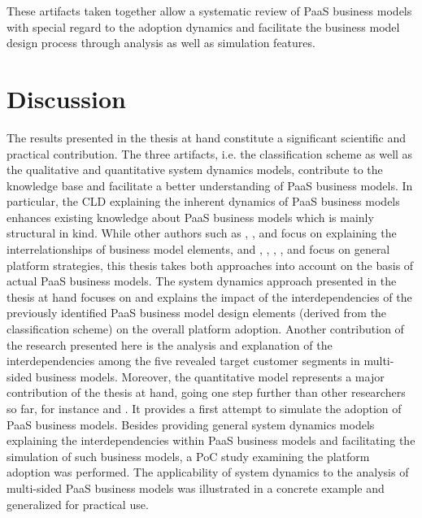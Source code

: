 	These artifacts taken together allow a systematic review of \ac{PaaS} business models with special regard to the adoption dynamics and facilitate the business model design process through analysis as well as simulation features. 

	

	\section{Discussion}\label{ch:dc:d}
		
	The results presented in the thesis at hand constitute a significant scientific and practical contribution. The three artifacts, i.e. the classification scheme as well as the qualitative and quantitative system dynamics models, contribute to the knowledge base and facilitate a better understanding of \ac{PaaS} business models. In particular, the \ac{CLD} explaining the inherent dynamics of \ac{PaaS} business models enhances existing knowledge about \ac{PaaS} business models which is mainly structural in kind. While other authors such as \citet{BenLagha2001}, \citet{Klueber2000}, and \citet{Kiani2009} focus on explaining the interrelationships of business model elements, and \citet{Cusumano2010}, \citet{Gawer2008}, \citet{Cusumano2002}, \citet{Eisenmann2006}, and \citet{Beimborn2011} focus on general platform strategies, this thesis takes both approaches into account on the basis of actual \ac{PaaS} business models. The system dynamics approach presented in the thesis at hand focuses on and explains the impact of the interdependencies of the previously identified \ac{PaaS} business model design elements (derived from the classification scheme) on the overall platform adoption. Another contribution of the research presented here is the analysis and explanation of the interdependencies among the five revealed target customer segments in multi-sided business models. Moreover, the quantitative model represents a major contribution of the thesis at hand, going one step further than other researchers so far, for instance \citet{Klueber2000} and \citet{Kiani2009}. It provides a first attempt to simulate the adoption of \ac{PaaS} business models. Besides providing general system dynamics models explaining the interdependencies within \ac{PaaS} business models and facilitating the simulation of such business models, a \acf{PoC} study examining the platform adoption was performed. The applicability of system dynamics to the analysis of multi-sided \ac{PaaS} business models was illustrated in a concrete example and generalized for practical use.

